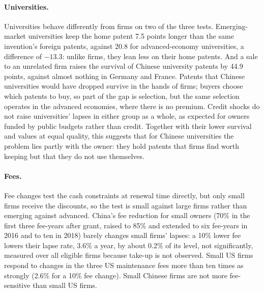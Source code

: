 \paragraph{Universities.} Universities behave differently from firms on two of the three tests. Emerging-market
universities keep the home patent 7.5 points longer than the same invention's foreign patents, against 20.8 for
advanced-economy universities, a difference of $-13.3$: unlike firms, they lean less on their home patents. And a sale
to an unrelated firm raises the survival of Chinese university patents by 44.9 points, against almost nothing in
Germany and France. Patents that Chinese universities would have dropped survive in the hands of firms; buyers choose
which patents to buy, so part of the gap is selection, but the same selection operates in the advanced economies,
where there is no premium. Credit shocks do not raise universities' lapses in either group as a whole, as expected for
owners funded by public budgets rather than credit. Together with their lower survival and values at equal quality,
this suggests that for Chinese universities the problem lies partly with the owner: they hold patents that firms find
worth keeping but that they do not use themselves.

\paragraph{Fees.} Fee changes test the cash constraints at renewal time directly, but only small firms receive the
discounts, so the test is small against large firms rather than emerging against advanced. China's fee reduction for
small owners (70\% in the first three fee-years after grant, raised to 85\% and extended to six fee-years in 2016 and
to ten in 2018) barely changes small firms' lapses: a 10\% lower fee lowers their lapse rate, 3.6\% a year, by about
0.2\% of its level, not significantly, measured over all eligible firms because take-up is not observed. Small US
firms respond to changes in the three US maintenance fees more than ten times as strongly (2.6\% for a 10\% fee change). Small Chinese firms are not
more fee-sensitive than small US firms.
